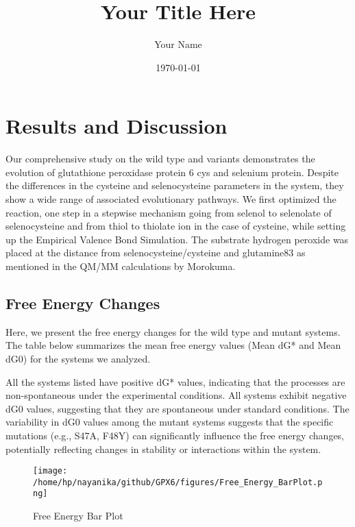 \documentclass{article}
\begin{document}
\title{Your Title Here}
\author{Your Name}
\date{\today}
\maketitle

\section{Results and Discussion}

Our comprehensive study on the wild type and variants demonstrates the evolution of glutathione peroxidase protein 6 cys and selenium protein. 
Despite the differences in the cysteine and selenocysteine parameters in the system, they show a wide range of associated evolutionary pathways. 
We first optimized the reaction, one step in a stepwise mechanism going from selenol to selenolate of selenocysteine and from thiol to thiolate ion in the case of cysteine, while setting up the Empirical Valence Bond Simulation. 
The substrate hydrogen peroxide was placed at the distance from selenocysteine/cysteine and glutamine83 as mentioned in the QM/MM calculations by Morokuma.

\subsection{Free Energy Changes}

Here, we present the free energy changes for the wild type and mutant systems. The table below summarizes the mean free energy values (Mean dG* and Mean dG0) for the systems we analyzed.

All the systems listed have positive dG* values, indicating that the processes are non-spontaneous under the experimental conditions. All systems exhibit negative dG0 values, suggesting that they are spontaneous under standard conditions. The variability in dG0 values among the mutant systems suggests that the specific mutations (e.g., S47A, F48Y) can significantly influence the free energy changes, potentially reflecting changes in stability or interactions within the system.



\begin{figure}[H] %
    \centering
    \texttt{[image: /home/hp/nayanika/github/GPX6/figures/Free\_Energy\_BarPlot.png]} %
    \caption{Free Energy Bar Plot}
    \label{fig:free_energy_barplot}
\end{figure}
\end{document}
